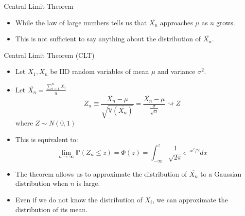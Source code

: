 \documentclass[handout]{beamer}
\begin{document}
\begin{frame}{Central Limit Theorem}
\scriptsize{
\begin{itemize}
 \item  While the law of large numbers tells us that  $\overline{X_{n}}$ approaches $\mu$ as $n$ grows.
 \item This is not sufficient to say anything about the distribution of  $\overline{X_{n}}$.
\end{itemize}

\begin{block}{Central Limit Theorem (CLT)}
\begin{itemize}
 \item Let $X_1, X_n$ be IID random variables of mean $\mu$ and variance $\sigma^2$.
 \item Let $\overline{X_{n}}=\frac{\sum_{i=1}^{n} X_i}{n}$
\begin{displaymath}
 Z_{n} \equiv \frac{\overline{X_{n}}-\mu}{\sqrt{\mathbb{V}(\overline{X_{n}})}}=\frac{\overline{X_{n}}-\mu}{\frac{\sigma}{\sqrt{n}}}  \rightsquigarrow Z
\end{displaymath}
where $Z\sim N(0,1)$
\item This is equivalent to:
\begin{displaymath}
 \lim_{n\rightarrow \infty} \mathbb{P}(Z_{n} \leq z) = \Phi(z) = \int_{-\infty}^{z}\frac{1}{\sqrt{2\pi}}e^{-x^2/2}dx
\end{displaymath}
\end{itemize}
\end{block}
\begin{itemize}
 \item The theorem allows us to approximate the distribution of $\overline{X_{n}}$ to a Gaussian distribution when $n$ is large. 
 \item Even if we do not know the distribution of $X_{i}$, we can approximate the distribution of its mean.
\end{itemize}



} 
\end{frame}
\end{document}
